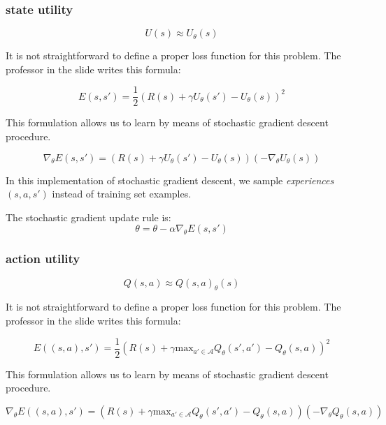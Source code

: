 \subsubsection{state utility}
\begin{equation}
    U(s) \approx U_\theta(s)
\end{equation}

It is not straightforward to define a proper loss function for this problem. The professor in the slide writes this formula:

\begin{equation}
    E(s,s') = \frac{1}{2} (R(s) + \gamma U_{\theta} (s') - U_{\theta}(s))^2
\end{equation}

This formulation allows us to learn by means of stochastic gradient descent procedure.

\begin{equation}
    \nabla_{\theta} E(s,s') = (R(s) + \gamma U_{\theta} (s') - U_{\theta}(s)) (- \nabla_{\theta}U_{\theta}(s))
\end{equation}

In this implementation of stochastic gradient descent, we sample \textit{experiences} $(s,a,s')$ instead of training set examples.  \newline

The stochastic gradient update rule is:
\begin{equation}
    \theta = \theta - \alpha \nabla_{\theta}E(s, s')
\end{equation}

\subsubsection{action utility}
\begin{equation}
    Q(s,a) \approx Q(s,a)_\theta(s)
\end{equation}

It is not straightforward to define a proper loss function for this problem. The professor in the slide writes this formula:

\begin{equation}
    E((s,a),s') = \frac{1}{2} (R(s) + \gamma \text{max}_{a' \in \mathcal{A}} Q_{\theta} (s', a') - Q_{\theta}(s,a))^2
\end{equation}

This formulation allows us to learn by means of stochastic gradient descent procedure.

\begin{equation}
    \nabla_{\theta} E((s,a),s') = (R(s) + \gamma \text{max}_{a' \in \mathcal{A}} Q_{\theta} (s', a') - Q_{\theta}(s,a)) (- \nabla_{\theta}Q_{\theta}(s,a))
\end{equation}

